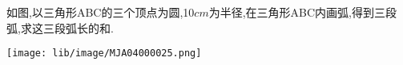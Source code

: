 如图,以三角形ABC的三个顶点为圆,10$cm$为半径,在三角形ABC内画弧,得到三段弧,求这三段弧长的和.

\begin{flushright}

    \texttt{[image: lib/image/MJA04000025.png]}

\end{flushright}




